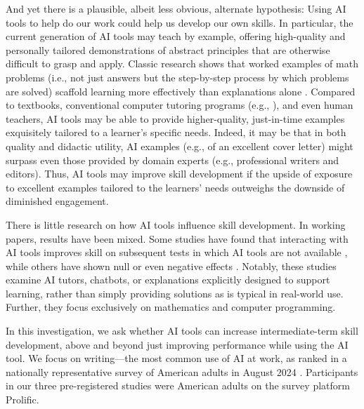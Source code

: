 \documentclass[11pt]{report}
\begin{document}
\begin{mainf}
And yet there is a plausible, albeit less obvious, alternate hypothesis: Using AI tools to help do our work could help us develop our own skills. 
    In particular, the current generation of AI tools may teach by example, offering high-quality and personally tailored demonstrations of abstract principles that are otherwise difficult to grasp and apply.
    Classic research shows that worked examples of math problems (i.e., not just answers but the step-by-step process by which problems are solved) scaffold learning more effectively than explanations alone \cite{sweller1985use, atkinson2000learning}. 
     Compared to textbooks, conventional computer tutoring programs (e.g., \cite{anderson1995cognitive}), and even human teachers, AI tools may be able to provide higher-quality, just-in-time examples exquisitely tailored to a learner's specific needs.  Indeed, it may be that in both quality and didactic utility, AI examples (e.g., of an excellent cover letter)  might surpass even those provided by domain experts (e.g., professional writers and editors).  
    Thus, AI tools may improve skill development if the upside of exposure to excellent examples tailored to the learners' needs outweighs the downside of diminished engagement. 

There is little research on how AI tools influence skill development. 
  In working papers, results have been mixed. 
  Some studies have found that interacting with AI tools improves skill on subsequent tests in which AI tools are not available \cite{kumar2023, lehmann2024ai}, while others have shown null or even negative effects \cite{bastani2024, nie2024gpt,lehmann2024ai}. 
  Notably, these studies examine AI tutors, chatbots, or explanations explicitly designed to support learning, rather than simply providing solutions as is typical in real-world use. 
  Further, they focus exclusively on mathematics and computer programming. 

In this investigation, we ask whether AI tools can increase intermediate-term skill development, above and beyond just improving performance while using the AI tool.
  We focus on writing---the most common use of AI at work, as ranked in a nationally representative survey of American adults in August 2024  \cite{bick2024rapid}. 
  Participants in our three pre-registered studies were American adults on the survey platform Prolific. 
  

\end{mainf}
\end{document}
